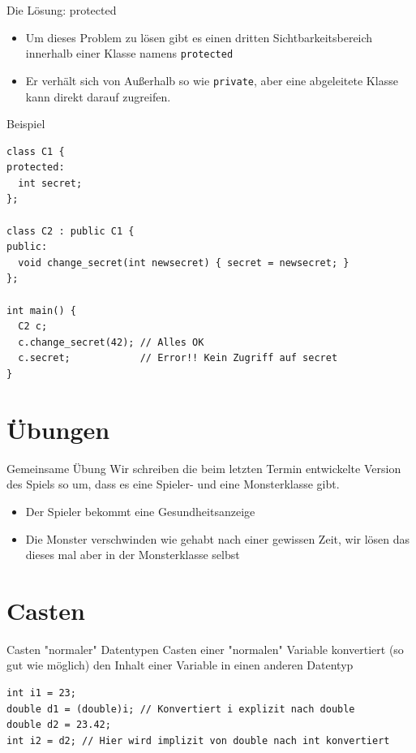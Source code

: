 \documentclass[presentation]{beamer}
\begin{document}
\begin{frame}[label={sec:org8c1ba34},fragile]{Die Lösung: protected}
 \begin{itemize}
\item Um dieses Problem zu lösen gibt es einen dritten
Sichtbarkeitsbereich innerhalb einer Klasse namens {\color{solarizedYellow}\verb!protected!}
\item Er verhält sich von Außerhalb so wie {\color{solarizedYellow}\verb!private!}, aber eine
abgeleitete Klasse kann direkt darauf zugreifen.
\end{itemize}
\begin{exampleblock}{Beispiel}
\begin{verbatim}
class C1 {
protected:
  int secret;
};

class C2 : public C1 {
public:
  void change_secret(int newsecret) { secret = newsecret; }
};

int main() {
  C2 c;
  c.change_secret(42); // Alles OK
  c.secret;            // Error!! Kein Zugriff auf secret
}

\end{verbatim}
\end{exampleblock}
\end{frame}
\section{Übungen}
\label{sec:org451a068}
\begin{frame}[label={sec:org82fb74f}]{Gemeinsame Übung}
Wir schreiben die beim letzten Termin entwickelte Version des Spiels
so um, dass es eine \alert{Spieler- und eine Monsterklasse} gibt.
\begin{itemize}
\item Der Spieler bekommt eine Gesundheitsanzeige
\item Die Monster verschwinden wie gehabt nach einer gewissen Zeit, wir
lösen das dieses mal aber in der Monsterklasse selbst
\end{itemize}
\end{frame}
\section{Casten}
\label{sec:orgb361e19}
\begin{frame}[label={sec:org70716a9},fragile]{Casten "normaler" Datentypen}
 Casten einer "normalen" Variable konvertiert (so gut wie möglich) den
Inhalt einer Variable in einen anderen Datentyp
\begin{verbatim}
int i1 = 23;
double d1 = (double)i; // Konvertiert i explizit nach double
double d2 = 23.42;
int i2 = d2; // Hier wird implizit von double nach int konvertiert
\end{verbatim}
\end{frame}
\end{document}
